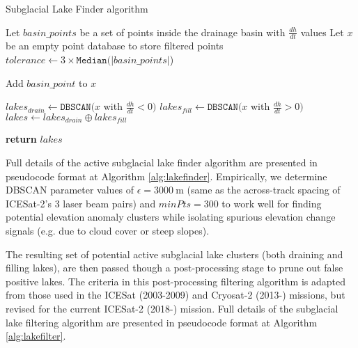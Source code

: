 \begin{algorithm}
  \caption{Subglacial Lake Finder algorithm}\label{alg:lakefinder}
  \begin{algorithmic}

      \State Let $basin\_points$ be a set of points inside the drainage basin with $\frac{dh}{dt}$ values %
      \State Let $x$ be an empty point database to store filtered points
      \State $tolerance \gets 3 \times \texttt{Median}(\lvert basin\_points \rvert$)

           
            \State Add $basin\_point$ to $x$
          \EndIf
        \EndFor

      \State $lakes_{drain} \gets \texttt{DBSCAN}(x$ with $\frac{dh}{dt} < 0)$ 
      \State $lakes_{fill} \gets \texttt{DBSCAN}(x$ with $\frac{dh}{dt} > 0)$ 
      \State $lakes \gets lakes_{drain} \oplus lakes_{fill}$ 

      \State \textbf{return} $lakes$
     \EndFor
  \end{algorithmic}
\end{algorithm}

Full details of the active subglacial lake finder algorithm are presented in pseudocode format at Algorithm \ref{alg:lakefinder}.
Empirically, we determine \gls{DBSCAN} parameter values of $\epsilon=\SI{3000}{\metre}$ (same as the across-track spacing of ICESat-2's 3 laser beam pairs) and $minPts=300$ to work well for finding potential elevation anomaly clusters while isolating spurious elevation change signals (e.g. due to cloud cover or steep slopes).

The resulting set of potential active subglacial lake clusters (both draining and filling lakes), are then passed though a post-processing stage to prune out false positive lakes.
The criteria in this post-processing filtering algorithm is adapted from those used in the ICESat (2003-2009) \citep{FrickerActiveSubglacialWater2007,Smithinventoryactivesubglacial2009} and Cryosat-2 (2013-) \citep[e.g.][]{KimActivesubglaciallakes2016,SiegfriedThirteenyearssubglacial2018} missions, but revised for the current ICESat-2 (2018-) mission.
Full details of the subglacial lake filtering algorithm are presented in pseudocode format at Algorithm \ref{alg:lakefilter}.

